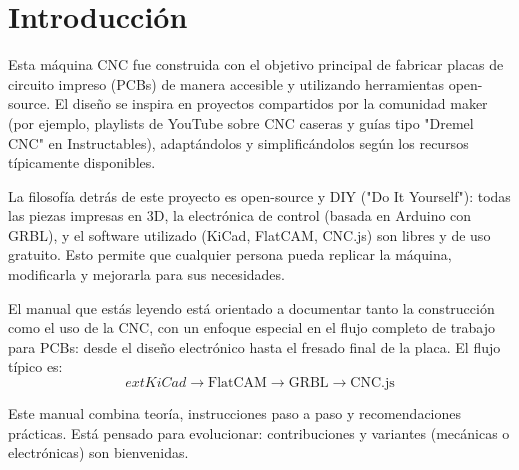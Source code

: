 \chapter{Introducción}
\label{ch:intro}

Esta máquina CNC fue construida con el objetivo principal de fabricar placas de circuito impreso (PCBs) de manera accesible y utilizando herramientas open-source. El diseño se inspira en proyectos compartidos por la comunidad maker (por ejemplo, playlists de YouTube sobre CNC caseras y guías tipo "Dremel CNC" en Instructables), adaptándolos y simplificándolos según los recursos típicamente disponibles.

La filosofía detrás de este proyecto es open-source y DIY ("Do It Yourself"): todas las piezas impresas en 3D, la electrónica de control (basada en Arduino con GRBL), y el software utilizado (KiCad, FlatCAM, CNC.js) son libres y de uso gratuito. Esto permite que cualquier persona pueda replicar la máquina, modificarla y mejorarla para sus necesidades.

El manual que estás leyendo está orientado a documentar tanto la construcción como el uso de la CNC, con un enfoque especial en el flujo completo de trabajo para PCBs: desde el diseño electrónico hasta el fresado final de la placa. El flujo típico es:
\[
		ext{KiCad} \rightarrow \text{FlatCAM} \rightarrow \text{GRBL} \rightarrow \text{CNC.js}
\]

\begin{notebox}
Este manual combina teoría, instrucciones paso a paso y recomendaciones prácticas. Está pensado para evolucionar: contribuciones y variantes (mecánicas o electrónicas) son bienvenidas.
\end{notebox}


